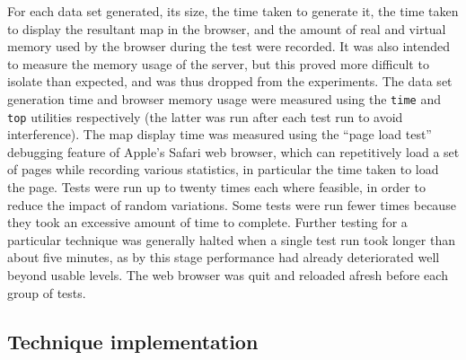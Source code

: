 \documentclass[acmnow]{acmtrans2m}
\begin{document}
For each data set generated, its size, the time taken to generate it,
the time taken to display the resultant map in the browser, and the
amount of real and virtual memory used by the browser during the test
were recorded. It was also intended to measure the memory usage of the
server, but this proved more difficult to isolate than expected, and was
thus dropped from the experiments. The data set generation time and
browser memory usage were measured using the \texttt{time} and
\texttt{top} utilities respectively (the latter was run after each test
run to avoid interference). The map display time was measured using the
``page load test'' debugging feature of Apple's Safari web browser,
which can repetitively load a set of pages while recording various
statistics, in particular the time taken to load the page. Tests were
run up to twenty times each where feasible, in order to reduce the
impact of random variations. Some tests were run fewer times because
they took an excessive amount of time to complete. Further testing for a
particular technique was generally halted when a single test run took
longer than about five minutes, as by this stage performance had already
deteriorated well beyond usable levels. The web browser was quit and
reloaded afresh before each group of tests.


\subsection{Technique implementation}
\end{document}
